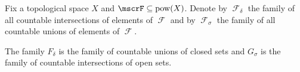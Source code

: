 \begin{definition}\label{def:borel_algebra}
  Fix a topological space \( X \) and \( \mscrF \subseteq \pow(X) \). Denote by \( \mscrF_\delta \) the family of all countable intersections of elements of \( \mscrF \) and by \( \mscrF_\sigma \) the family of all countable unions of elements of \( \mscrF \).

  The family \( F_\delta \) is the family of countable unions of closed sets and \( G_\sigma \) is the family of countable intersections of open sets.
\end{definition}
